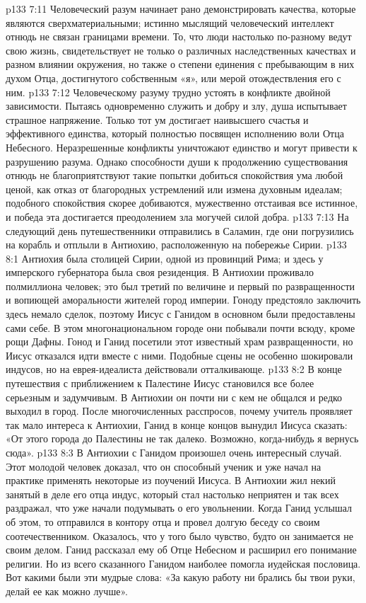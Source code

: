 \vs p133 7:11 Человеческий разум начинает рано демонстрировать качества, которые являются сверхматериальными; истинно мыслящий человеческий интеллект отнюдь не связан границами времени. То, что люди настолько по\hyp{}разному ведут свою жизнь, свидетельствует не только о различных наследственных качествах и разном влиянии окружения, но также о степени единения с пребывающим в них духом Отца, достигнутого собственным «я», или мерой отождествления его с ним.
\vs p133 7:12 Человеческому разуму трудно устоять в конфликте двойной зависимости. Пытаясь одновременно служить и добру и злу, душа испытывает страшное напряжение. Только тот ум достигает наивысшего счастья и эффективного единства, который полностью посвящен исполнению воли Отца Небесного. Неразрешенные конфликты уничтожают единство и могут привести к разрушению разума. Однако способности души к продолжению существования отнюдь не благоприятствуют такие попытки добиться спокойствия ума любой ценой, как отказ от благородных устремлений или измена духовным идеалам; подобного спокойствия скорее добиваются, мужественно отстаивая все истинное, и победа эта достигается преодолением зла могучей силой добра.
\vs p133 7:13 \pc На следующий день путешественники отправились в Саламин, где они погрузились на корабль и отплыли в Антиохию, расположенную на побережье Сирии.
\vs p133 8:1 Антиохия была столицей Сирии, одной из провинций Рима; и здесь у имперского губернатора была своя резиденция. В Антиохии проживало полмиллиона человек; это был третий по величине и первый по развращенности и вопиющей аморальности жителей город империи. Гоноду предстояло заключить здесь немало сделок, поэтому Иисус с Ганидом в основном были предоставлены сами себе. В этом многонациональном городе они побывали почти всюду, кроме рощи Дафны. Гонод и Ганид посетили этот известный храм развращенности, но Иисус отказался идти вместе с ними. Подобные сцены не особенно шокировали индусов, но на еврея\hyp{}идеалиста действовали отталкивающе.
\vs p133 8:2 В конце путешествия с приближением к Палестине Иисус становился все более серьезным и задумчивым. В Антиохии он почти ни с кем не общался и редко выходил в город. После многочисленных расспросов, почему учитель проявляет так мало интереса к Антиохии, Ганид в конце концов вынудил Иисуса сказать: «От этого города до Палестины не так далеко. Возможно, когда\hyp{}нибудь я вернусь сюда».
\vs p133 8:3 \pc В Антиохии с Ганидом произошел очень интересный случай. Этот молодой человек доказал, что он способный ученик и уже начал на практике применять некоторые из поучений Иисуса. В Антиохии жил некий занятый в деле его отца индус, который стал настолько неприятен и так всех раздражал, что уже начали подумывать о его увольнении. Когда Ганид услышал об этом, то отправился в контору отца и провел долгую беседу со своим соотечественником. Оказалось, что у того было чувство, будто он занимается не своим делом. Ганид рассказал ему об Отце Небесном и расширил его понимание религии. Но из всего сказанного Ганидом наиболее помогла иудейская пословица. Вот какими были эти мудрые слова: «За какую работу ни брались бы твои руки, делай ее как можно лучше».
